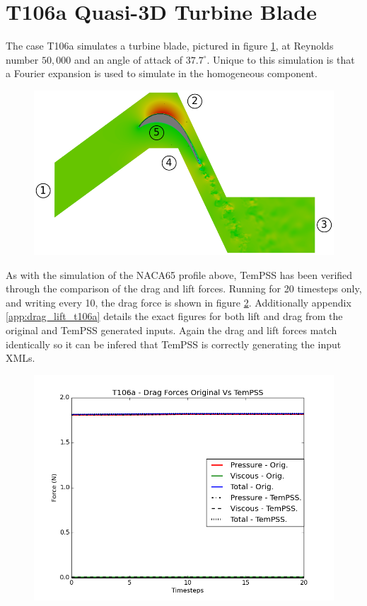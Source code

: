 \documentclass[11pt, a4paper]{report}
\begin{document}
\newpage
\section{T106a Quasi-3D Turbine Blade}
The case T106a simulates a turbine blade, pictured in figure \ref{fig:t106a_domain}, at Reynolds number $50,000$ and an angle of attack of $37.7^{\circ}$. Unique to this simulation is that a Fourier expansion is used to simulate in the homogeneous component.

\begin{figure}[htb!]
 \centering
 \includegraphics[width=.75\linewidth,  clip=true, trim = 0cm 0cm 0cm 0cm]{t106a_domain}
 \label{fig:t106a_domain}
\end{figure}

As with the simulation of the NACA65 profile above, TemPSS has been verified through the comparison of the drag and lift forces. Running for 20 timesteps only, and writing every 10, the drag force is shown in figure \ref{fig:drag_lift_t106a}. Additionally appendix \ref{app:drag_lift_t106a}  details the exact figures for both lift and drag from the original and TemPSS generated inputs. Again the drag and lift forces match identically so it can be infered that TemPSS is correctly generating the input XMLs.

\begin{figure}[htb!]
 \centering
 \includegraphics[width=.75\linewidth,  clip=true, trim = 0cm 0cm 0cm 0cm]{drag_t106a}
 \label{fig:drag_lift_t106a}
\end{figure}
\end{document}
